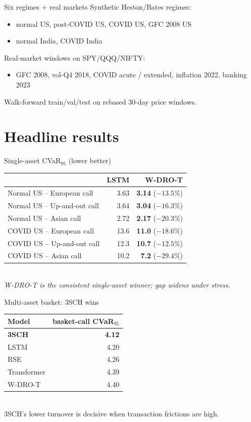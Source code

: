 \documentclass[aspectratio=169,10pt]{beamer}
\begin{document}
\begin{frame}{Six regimes + real markets}
Synthetic Heston/Bates regimes:
\begin{itemize}
\item normal US, post-COVID US, COVID US, GFC 2008 US
\item normal India, COVID India
\end{itemize}
Real-market windows on SPY/QQQ/NIFTY:
\begin{itemize}
\item GFC 2008, vol-Q4 2018, COVID acute / extended,
  inflation 2022, banking 2023
\end{itemize}
Walk-forward train/val/test on rebased $30$-day price windows.
\end{frame}

\section{Headline results}

\begin{frame}{Single-asset CVaR$_{95}$ (lower better)}
\centering\small
\begin{tabular}{lrr}
\toprule
& LSTM & W-DRO-T \\\midrule
Normal US -- European call   & 3.63 & \textbf{3.14} ($-13.5\%$) \\
Normal US -- Up-and-out call & 3.64 & \textbf{3.04} ($-16.3\%$) \\
Normal US -- Asian call      & 2.72 & \textbf{2.17} ($-20.3\%$) \\
COVID US -- European call    & 13.6 & \textbf{11.0} ($-18.6\%$) \\
COVID US -- Up-and-out call  & 12.3 & \textbf{10.7} ($-12.5\%$) \\
COVID US -- Asian call       & 10.2 & \textbf{7.2}  ($-29.4\%$) \\
\bottomrule
\end{tabular}\\[3mm]
\textit{W-DRO-T is the consistent single-asset winner; gap widens under stress.}
\end{frame}

\begin{frame}{Multi-asset basket: 3SCH wins}
\centering\small
\begin{tabular}{lr}
\toprule
Model & basket-call CVaR$_{95}$ \\\midrule
\textbf{3SCH} & \textbf{4.12} \\
LSTM & 4.20 \\
RSE & 4.26 \\
Transformer & 4.39 \\
W-DRO-T & 4.40 \\
\bottomrule
\end{tabular}\\[3mm]
3SCH's lower turnover is decisive when transaction frictions are high.
\end{frame}
\end{document}
